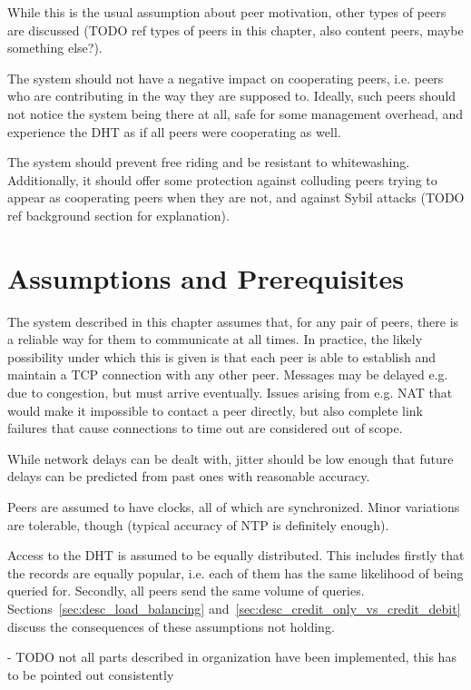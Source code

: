 While this is the usual assumption about peer motivation, other types of peers
are discussed (TODO ref types of peers in this chapter, also content peers,
maybe something else?).

The system should not have a negative impact on cooperating peers, i.e. peers
who are contributing in the way they are supposed to. Ideally, such peers should
not notice the system being there at all, safe for some management overhead, and
experience the \ac{DHT} as if all peers were cooperating as well.

The system should prevent free riding and be resistant to whitewashing.
Additionally, it should offer some protection against colluding peers trying to
appear as cooperating peers when they are not, and against Sybil attacks (TODO
ref background section for explanation).

\section{Assumptions and Prerequisites}
The system described in this chapter assumes that, for any pair of peers, there
is a reliable way for them to communicate at all times. In practice, the likely
possibility under which this is given is that each peer is able to establish and
maintain a TCP connection with any other peer. Messages may be delayed e.g. due
to congestion, but must arrive eventually. Issues arising from e.g. NAT that
would make it impossible to contact a peer directly, but also complete link
failures that cause connections to time out are considered out of scope.

While network delays can be dealt with, jitter should be low enough that future
delays can be predicted from past ones with reasonable accuracy.

Peers are assumed to have clocks, all of which are synchronized. Minor
variations are tolerable, though (typical accuracy of NTP is definitely enough).

Access to the \ac{DHT} is assumed to be equally distributed. This includes
firstly that the records are equally popular, i.e. each of them has the same
likelihood of being queried for. Secondly, all peers send the same volume of
queries. Sections~\ref{sec:desc_load_balancing}
and~\ref{sec:desc_credit_only_vs_credit_debit} discuss the consequences of these
assumptions not holding.

- TODO not all parts described in organization have been implemented, this has
  to be pointed out consistently

